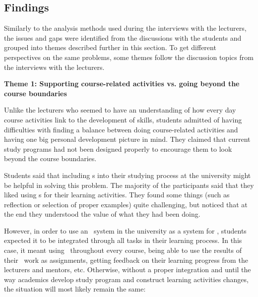 \subsection{Findings}

Similarly to the analysis methods used during the interviews with the lecturers,
the issues and gaps were identified from the discussions with the students and
grouped into themes described further in this section. To get different
perspectives on the same problems, some themes follow the discussion topics from
the interviews with the lecturers.

\textbf{Theme 1: Supporting course-related activities vs. going beyond the
course boundaries}

Unlike the lecturers who seemed to have an understanding of how every day
course activities link to the development of \LLLs skills, students admitted 
of having difficulties with finding a balance between doing course-related
activities and having one big personal development picture in mind. They claimed
that current study programs had not been designed properly to encourage them to
look beyond the course boundaries.


Students said that including \ep s into their studying process at the university
might be helpful in solving this problem. The majority of the participants said
that they liked using \ep s for their learning activities. They found some
things (such as reflection or selection of proper examples) quite challenging,
but noticed that at the end they understood the value of what they had been
doing.

However, in order to use an \ep~system in the university as a system for \LLLsn,
students expected it to be integrated through all tasks in their learning
process. In this case, it meant using \ep~throughout every course, being able to
use the results of their \ep~work as assignments, getting feedback on their
learning progress from the lecturers and mentors, etc. Otherwise, without a
proper integration and until the way academics develop study program and
construct learning activities changes, the situation will most likely remain the
same:


